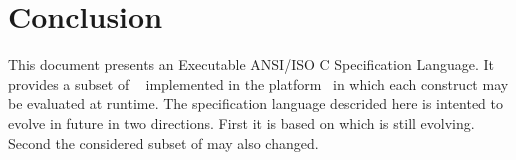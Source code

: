 
\chapter{Conclusion}

This document presents an Executable ANSI/ISO C Specification Language. It
provides a subset of \acsl~\cite{acsl} implemented in the \framac
platform~\cite{framac} in which each construct may be evaluated at runtime. The
specification language descrided here is intented to evolve in future in two
directions. First it is based on \acsl which is still evolving. Second the
considered subset of \acsl may also changed.
